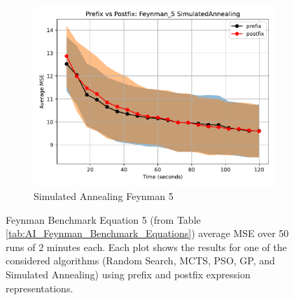 \documentclass[12pt]{iopart}
\begin{document}
\begin{figure}
    \vspace{0.5cm}
    
    \begin{subfigure}[b]{0.4\textwidth}
        \includegraphics[width=\linewidth, keepaspectratio]{AIFeynman_Benchmarks/PrePostFeynman_5SimulatedAnnealing.pdf}
        \caption{Simulated Annealing Feynman 5}
        \label{subfig:feynman_5_SA}
    \end{subfigure}
    
    \caption{Feynman Benchmark Equation 5 (from Table \ref{tab:AI_Feynman_Benchmark_Equations}) average MSE over 50 runs of 2 minutes each. Each plot shows the results for one of the considered algorithms (Random Search, MCTS, PSO, GP, and Simulated Annealing) using prefix and postfix expression representations.}
    \label{fig:AIFeynman_5_Benchmarks}
\end{figure}

\end{document}
